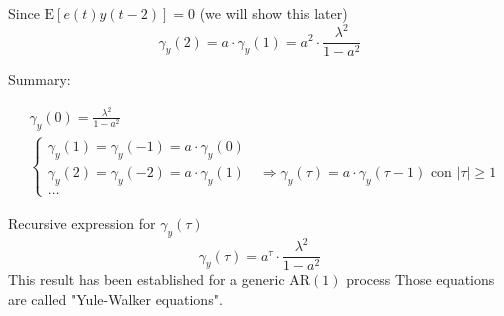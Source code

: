 Since $\mathrm{E}[e(t) y(t-2)]=0$ (we will show this later)
$$
\gamma_{y}(2)=a \cdot \gamma_{y}(1)=a^{2} \cdot \frac{\lambda^{2}}{1-a^{2}}
$$

Summary:

\begin{align*}
	&\gamma_{y}(0)=\frac{\lambda^{2}}{1-a^{2}} \\
	&\left\{\begin{array}{l}
		\gamma_{y}(1)=\gamma_{y}(-1)=a \cdot \gamma_{y}(0) \\
		\gamma_{y}(2)=\gamma_{y}(-2)=a \cdot \gamma_{y}(1) \quad \Rightarrow \gamma_{y}(\tau)=a \cdot \gamma_{y}(\tau-1) \text { con }|\tau| \geq 1 \\
		\ldots
	\end{array}\right.
\end{align*}

Recursive expression for $\gamma_{y}(\tau)$
$$
\gamma_{y}(\tau)=a^{\tau} \cdot \frac{\lambda^{2}}{1-a^{2}}
$$
This result has been established for a generic $\mathrm{AR}(1)$ process
Those equations are called "Yule-Walker equations".


